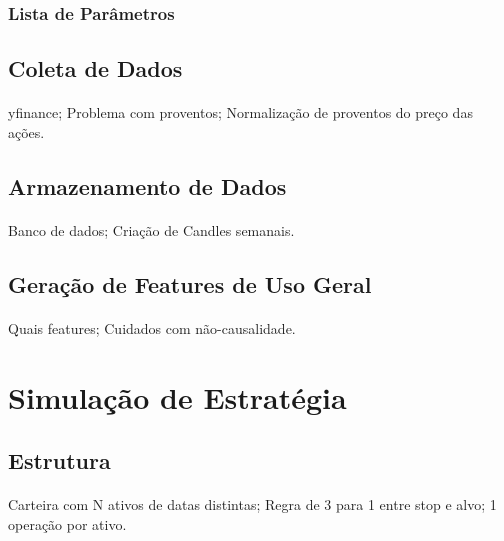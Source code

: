 \subsubsection*{Lista de Parâmetros}
















\subsection{Coleta de Dados}
\paragraph{} yfinance; Problema com proventos; Normalização de proventos do preço das ações.

\subsection{Armazenamento de Dados}
\paragraph{} Banco de dados; Criação de Candles semanais.

\subsection{Geração de Features de Uso Geral}
\paragraph{} Quais features; Cuidados com não-causalidade.


\section{Simulação de Estratégia}

\subsection{Estrutura}
\paragraph{} Carteira com N ativos de datas distintas; Regra de 3 para 1 entre stop e alvo; 1 operação por ativo.

